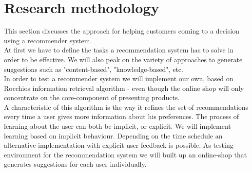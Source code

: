 


\section{Research methodology}

This section discusses the approach for helping customers coming to a decision using a recommender system.\\
At first we have to define the tasks a recommendation system has to solve in order to be effective.
We will also peak on the variety of approaches to generate suggestions such as "content-based", "knowledge-based", etc.\\
In order to test a recommender system we will implement our own, based on Rocchios information retrieval algorithm - even though the online shop will only concentrate on the core-component of presenting products.\\
A characteristic of this algorithm is the way it refines the set of recommendations every time a user gives more information about his preferences.\citep[p. 92]{lops:11}
The process of learning about the user can both be implicit, or explicit.
We will implement learning based on implicit behaviour.
Depending on the time schedule an alternative implementation with explicit user feedback is possible.
As testing environment for the recommendation system we will built up an online-shop that generates suggestions for each user individually.







